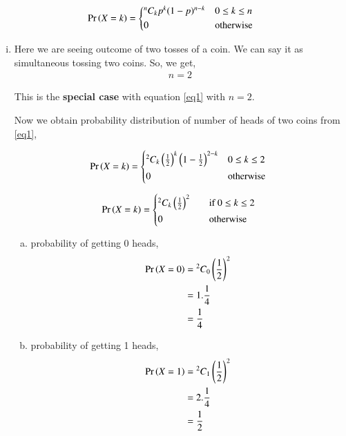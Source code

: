 \documentclass[journal,12pt,twocolumn]{IEEEtran}
\begin{document}
\begin{align}\label{eq1}
   \pr{X=k} =
  \begin{cases*}
    {^n C_k}p^{k}(1-p)^{n-k} & $0 \leq k \leq n$\\
      0 & otherwise
  \end{cases*}
\end{align}

\begin{enumerate}[(i)]
    \item Here we are seeing outcome of two tosses of a coin. We can     say it as simultaneous tossing two coins. So, we get,
        \begin{align}
            n=2
        \end{align}

    This is the \textbf{special case} with equation \eqref{eq1} with $n=2$.

Now we obtain probability distribution of number of heads of two coins from \eqref{eq1},

\begin{align*}
   \pr{X=k} =
  \begin{cases*}
    {^2 C_k}\brak{\frac{1}{2}}^{k}\brak{1-\frac{1}{2}}^{2-k} & $0 \leq k \leq 2$\\
    0 & otherwise
  \end{cases*}
\end{align*}

\begin{align}
   \pr{X=k} =
  \begin{cases*}
    {^2 C_k}\brak{\frac{1}{2}}^{2} \quad& if $0 \leq k \leq 2$ \\
    0 \quad& otherwise
  \end{cases*}
\end{align}


\begin{enumerate}[(a)]
    \item probability of getting 0 heads,
        \begin{align}
            \begin{split}
                \Pr\left(X=0\right) &= {^2C_0}\left(\frac{1}{2}\right)^2\\
                &=1.\frac{1}{4}\\
                &=\frac{1}{4}
            \end{split}
        \end{align}

    \item probability of getting 1 heads,
        \begin{align}
            \begin{split}
                \Pr\left(X=1\right) &= {^2C_1}\left(\frac{1}{2}\right)^2\\
                &=2.\frac{1}{4}\\
                &=\frac{1}{2}
            \end{split}
        \end{align}


\end{enumerate}
\end{enumerate}
\end{document}
